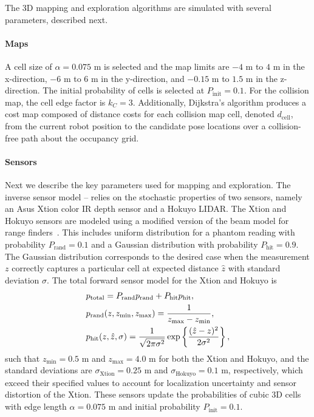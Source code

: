 The 3D mapping and exploration algorithms are simulated with several parameters, described next.

\paragraph{Maps}

A cell size of $\alpha=0.075$ m is selected and the map limits are $-4$ m to $4$ m in the x-direction, $-6$ m to $6$ m in the y-direction, and $-0.15$ m to $1.5$ m in the z-direction. The initial probability of cells is selected at $P_\text{init}=0.1$. For the collision map, the cell edge factor is $k_C=3$. Additionally, Dijkstra's algorithm produces a cost map composed of distance costs for each collision map cell, denoted $d_\text{cell}$, from the current robot position to the candidate pose locations over a collision-free path about the occupancy grid. 

\paragraph{Sensors}

Next we describe the key parameters used for mapping and exploration. The inverse sensor model -- relies on the stochastic properties of two sensors, namely an Asus Xtion color IR depth sensor and a Hokuyo LIDAR. The Xtion and Hokuyo sensors are modeled using a modified version of the beam model for range finders~\cite{ThrBurFox05}. This includes uniform distribution for a phantom reading with probability $P_\text{rand}=0.1$ and a Gaussian distribution with probability $P_\text{hit}=0.9$. The Gaussian distribution corresponds to the desired case when the measurement $z$ correctly captures a particular cell at expected distance $\hat{z}$ with standard deviation $\sigma$. The total forward sensor model for the Xtion and Hokuyo is
\begin{align}
&p_\text{total}=P_\text{rand}p_\text{rand}+P_\text{hit}p_\text{hit},
\\
&p_\text{rand}(z,z_\text{min},z_\text{max})=\frac1{z_\text{max}-z_\text{min}},
\\
&p_\text{hit}(z,\hat{z},\sigma)=\frac1{\sqrt{2\pi\sigma^2}}\exp\left\{ \frac{(\hat{z}-z)^2}{{2\sigma^2}} \right\},
\end{align}
such that $z_\text{min}=0.5$ m and $z_\text{max}=4.0$ m for both the Xtion and Hokuyo, and the standard deviations are $\sigma_\text{Xtion}=0.25$ m and $\sigma_\text{Hokuyo}=0.1$ m, respectively, which exceed their specified values to account for localization uncertainty and sensor distortion of the Xtion. These sensors update the probabilities of cubic 3D cells with edge length $\alpha=0.075$ m and initial probability $P_\text{init}=0.1$.

